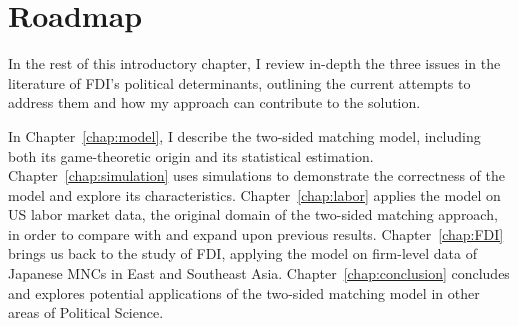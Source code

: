 \section{Roadmap}

In the rest of this introductory chapter, I review in-depth the three issues in
the literature of FDI's political determinants, outlining the current attempts
to address them and how my approach can contribute to the solution.

In Chapter~\ref{chap:model}, I describe the two-sided matching model, including
both its game-theoretic origin and its statistical estimation.
Chapter~\ref{chap:simulation} uses simulations to demonstrate the correctness of
the model and explore its characteristics. Chapter~\ref{chap:labor} applies the
model on US labor market data, the original domain of the two-sided matching
approach, in order to compare with and expand upon previous results.
Chapter~\ref{chap:FDI} brings us back to the study of FDI, applying the model on
firm-level data of Japanese MNCs in East and Southeast Asia.
Chapter~\ref{chap:conclusion} concludes and explores potential applications of
the two-sided matching model in other areas of Political Science.

